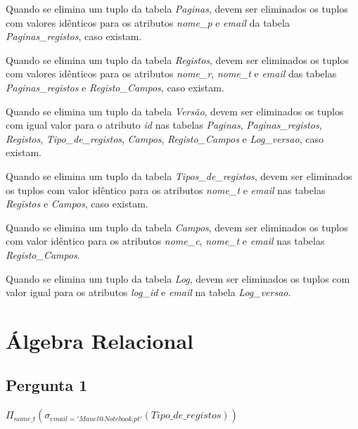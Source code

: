 \documentclass[11pt,a4paper]{article}
\begin{document}
\begin{description}[itemsep=3em]
  \item[RI15]Quando se elimina um tuplo da tabela \textit{Paginas}, devem ser eliminados os
tuplos com valores id\^{e}nticos para os atributos \textit{nome\_p} e \textit{email} da tabela \textit{Paginas\_registos}, caso existam.

  \item[RI16] Quando se elimina um tuplo da tabela \textit{Registos}, devem ser eliminados os
tuplos com valores id\^{e}nticos para os atributos \textit{nome\_r}, \textit{nome\_t} e \textit{email} das
tabelas \textit{Paginas\_registos} e \textit{Registo\_Campos}, caso existam.

  \item[RI17]Quando se elimina um tuplo da tabela \textit{Vers\~{a}o}, devem ser eliminados os
tuplos com igual valor para o atributo \textit{id} nas tabelas \textit{Paginas}, \textit{Paginas\_registos},
\textit{Registos}, \textit{Tipo\_de\_registos}, \textit{Campos}, \textit{Registo\_Campos} e \textit{Log\_versao}, caso existam.


  \item[RI18] Quando se elimina um tuplo da tabela \textit{Tipos\_de\_registos}, devem ser
eliminados os tuplos com valor id\^{e}ntico para os atributos \textit{nome\_t} e \textit{email} nas
tabelas \textit{Registos} e \textit{Campos}, caso existam.

  \item[RI19] Quando se elimina um tuplo da tabela \textit{Campos}, devem ser eliminados os
tuplos com valor id\^{e}ntico para os atributos \textit{nome\_c}, \textit{nome\_t} e \textit{email} nas tabelas
\textit{Registo\_Campos}.

  \item[RI20]Quando se elimina um tuplo da tabela \textit{Log}, devem ser eliminados os tuplos
com valor igual para os atributos \textit{log\_id} e \textit{email} na tabela \textit{Log\_versao}.
  
\end{description}


\newpage
\section{\'{A}lgebra Relacional}
\subsection{Pergunta 1}

$\Pi_{nome\_t}(\sigma_{email = 'Manel@Notebook.pt'}(Tipo\_de\_registos))$
\end{document}
